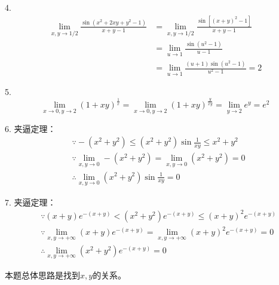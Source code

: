 4.
\begin{align*}
\underset{x,y\rightarrow 1/2}{\lim}\frac{\sin \left( x^2+2xy+y^2-1 \right)}{x+y-1}&=\underset{x,y\rightarrow 1/2}{\lim}\frac{\sin \left[ \left( x+y \right) ^2-1 \right]}{x+y-1} \\
&=\underset{u\rightarrow 1}{\lim}\frac{\sin \left( u^2-1 \right)}{u-1} \\
&=\underset{u\rightarrow 1}{\lim}\frac{\left( u+1 \right) \sin \left( u^2-1 \right)}{u^2-1}=2
\end{align*}

5.
\[
\underset{x\rightarrow 0,y\rightarrow 2}{\lim}\left( 1+xy \right) ^{\frac{1}{x}}=\underset{x\rightarrow 0,y\rightarrow 2}{\lim}\left( 1+xy \right) ^{\frac{y}{xy}}=\underset{y\rightarrow 2}{\lim}e^y=e^2
\]

6. 夹逼定理：
\begin{align*}
&\because -\left( x^2+y^2 \right) \leqslant \left( x^2+y^2 \right) \sin \frac{1}{xy}\leqslant x^2+y^2 \\
&\because \underset{x,y\rightarrow 0}{\lim}-\left( x^2+y^2 \right) =\underset{x,y\rightarrow 0}{\lim}\left( x^2+y^2 \right) =0 \\
&\therefore \underset{x,y\rightarrow 0}{\lim}\left( x^2+y^2 \right) \sin \frac{1}{xy}=0
\end{align*}

7. 夹逼定理：
\begin{align*}
&\because \left( x+y \right) e^{-\left( x+y \right)}<\left( x^2+y^2 \right) e^{-\left( x+y \right)}\leqslant \left( x+y \right) ^2e^{-\left( x+y \right)} \\
&\because \underset{x,y\rightarrow +\infty }{\lim}\left( x+y \right) e^{-\left( x+y \right)}=\underset{x,y\rightarrow +\infty }{\lim}\left( x+y \right) ^2e^{-\left( x+y \right)}=0 \\
&\therefore \underset{x,y\rightarrow +\infty }{\lim}\left( x^2+y^2 \right) e^{-\left( x+y \right)}=0
\end{align*}

\begin{tcolorbox}
本题总体思路是找到$x,y$的关系。
\end{tcolorbox}

~

